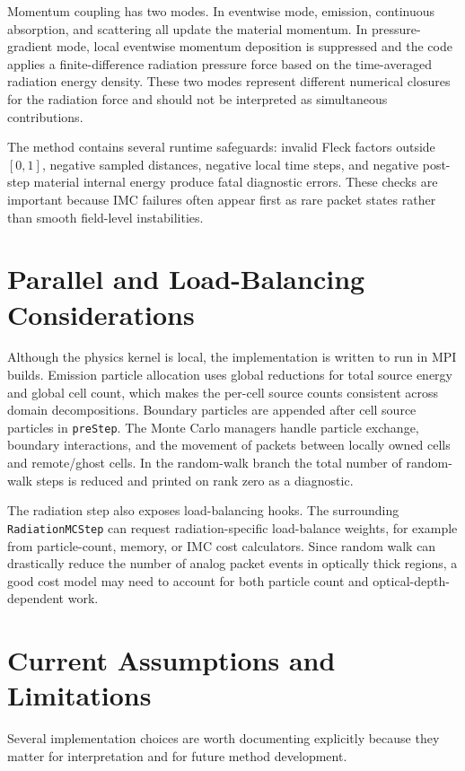 \documentclass[11pt]{article}
\begin{document}
Momentum coupling has two modes. In eventwise mode, emission, continuous
absorption, and scattering all update the material momentum. In pressure-gradient
mode, local eventwise momentum deposition is suppressed and the code applies a
finite-difference radiation pressure force based on the time-averaged radiation
energy density. These two modes represent different numerical closures for the
radiation force and should not be interpreted as simultaneous contributions.

The method contains several runtime safeguards: invalid Fleck factors outside
\([0,1]\), negative sampled distances, negative local time steps, and negative
post-step material internal energy produce fatal diagnostic errors. These checks
are important because IMC failures often appear first as rare packet states
rather than smooth field-level instabilities.

\section{Parallel and Load-Balancing Considerations}

Although the physics kernel is local, the implementation is written to run in
MPI builds. Emission particle allocation uses global reductions for total
source energy and global cell count, which makes the per-cell source counts
consistent across domain decompositions. Boundary particles are appended after
cell source particles in \texttt{preStep}. The Monte Carlo managers handle
particle exchange, boundary interactions, and the movement of packets between
locally owned cells and remote/ghost cells. In the random-walk branch the total
number of random-walk steps is reduced and printed on rank zero as a diagnostic.

The radiation step also exposes load-balancing hooks. The surrounding
\texttt{RadiationMCStep} can request radiation-specific load-balance weights,
for example from particle-count, memory, or IMC cost calculators. Since random
walk can drastically reduce the number of analog packet events in optically
thick regions, a good cost model may need to account for both particle count
and optical-depth-dependent work.

\section{Current Assumptions and Limitations}

Several implementation choices are worth documenting explicitly because they
matter for interpretation and for future method development.
\end{document}
